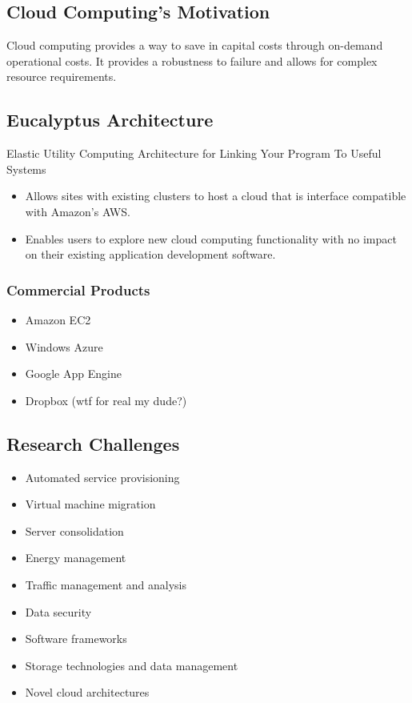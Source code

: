 \documentclass{math}
\begin{document}
\subsection*{Cloud Computing's Motivation}
Cloud computing provides a way to save in capital costs through on-demand
operational costs. It provides a robustness to failure and allows for complex
resource requirements.

\subsection*{Eucalyptus Architecture}
Elastic Utility Computing Architecture for Linking Your Program To Useful
Systems
\begin{itemize}
  \item Allows sites with existing clusters to host a cloud that is interface
  compatible with Amazon's AWS.
  \item Enables users to explore new cloud computing functionality with no
  impact on their existing application development software.
\end{itemize}

\subsubsection*{Commercial Products}
\begin{itemize}
  \item Amazon EC2
  \item Windows Azure
  \item Google App Engine
  \item Dropbox (wtf for real my dude?)
\end{itemize}

\subsection*{Research Challenges}
\begin{itemize}
  \item Automated service provisioning
  \item Virtual machine migration
  \item Server consolidation
  \item Energy management
  \item Traffic management and analysis
  \item Data security
  \item Software frameworks
  \item Storage technologies and data management
  \item Novel cloud architectures
\end{itemize}
\end{document}

